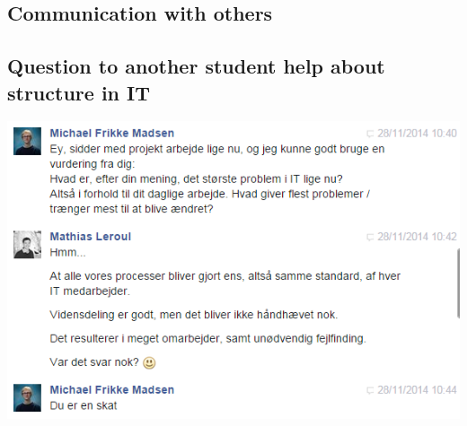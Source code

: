 \begin{linenumbers*}
\section{Communication with others}

\subsection{Question to another student help about structure in IT}
\includegraphics[width=1.36\textwidth]{appendix/other_communication_1}
\end{linenumbers*}
